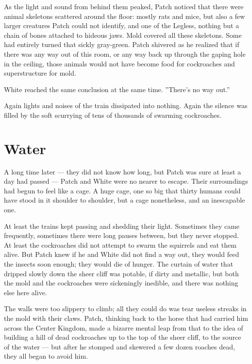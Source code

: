 \documentclass[12pt]{book}
\begin{document}
As the light and sound from behind them peaked, Patch noticed that there were animal skeletons scattered around the floor: mostly rats and mice, but also a few larger creatures Patch could not identify, and one of the Legless, nothing but a chain of bones attached to hideous jaws. Mold covered all these skeletons. Some had entirely turned that sickly gray-green. Patch shivered as he realized that if there was any way out of this room, or any way back up through the gaping hole in the ceiling, those animals would not have become food for cockroaches and superstructure for mold.

White reached the same conclusion at the same time. ''There's no way out.''

Again lights and noises of the train dissipated into nothing. Again the silence was filled by the soft scurrying of tens of thousands of swarming cockroaches.


\section{Water}

A long time later ---
they did not know how long, but Patch was sure at least a day had passed ---
Patch and White were no nearer to escape. Their surroundings had begun to feel like a cage. A huge cage, one so big that thirty humans could have stood in it shoulder to shoulder, but a cage nonetheless, and an inescapable one.

At least the trains kept passing and shedding their light. Sometimes they came frequently, sometimes there were long pauses between, but they never stopped. At least the cockroaches did not attempt to swarm the squirrels and eat them alive. But Patch knew if he and White did not find a way out, they would feed the insects soon enough; they would die of hunger. The curtain of water that dripped slowly down the sheer cliff was potable, if dirty and metallic, but both the mold and the cockroaches were sickeningly inedible, and there was nothing else here alive.

The walls were too slippery to climb; all they could do was tear useless streaks in the mold with their claws. Patch, thinking back to the horse that had carried him across the Center Kingdom, made a bizarre mental leap from that to the idea of building a hill of dead cockroaches up to the top of the sheer cliff, to the source of the water ---
but after he stomped and skewered a few dozen roaches dead, they all began to avoid him.
\end{document}
